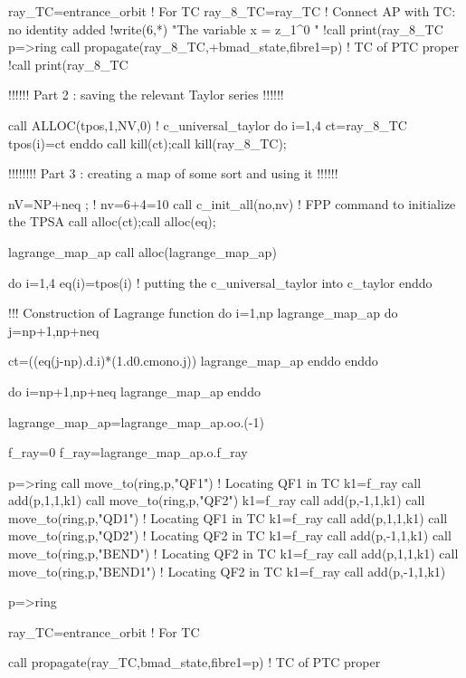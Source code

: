 \documentclass{hitec}     %
\begin{document}
{{\begin{code}
   ray_TC=entrance_orbit   !  For TC
   ray_8_TC=ray_TC  ! Connect AP with TC: no identity added
   !write(6,*) "The variable x = z_1^0 "
   !call print(ray_8_TC%
   p=>ring%
   call propagate(ray_8_TC,+bmad_state,fibre1=p) !  TC of PTC proper
   !call print(ray_8_TC%
   
   !!!!!! Part 2 : saving the relevant Taylor series  !!!!!!

   call ALLOC(tpos,1,NV,0) ! c_universal_taylor
   do i=1,4
    ct=ray_8_TC%
    tpos(i)=ct
   enddo
   call kill(ct);call kill(ray_8_TC);

!!!!!!!! Part 3 : creating a map of some sort and using it !!!!!!


   nV=NP+neq ;  ! nv=6+4=10
   call c_init_all(no,nv)   ! FPP command to initialize the TPSA
   call alloc(ct);call alloc(eq);

   lagrange_map_ap%
   call alloc(lagrange_map_ap)
   
   do i=1,4
    eq(i)=tpos(i)   ! putting the c_universal_taylor into c_taylor
   enddo
   
   !!!  Construction of Lagrange function
   do i=1,np
    lagrange_map_ap%
    do j=np+1,np+neq

     ct=((eq(j-np).d.i)*(1.d0.cmono.j))
     lagrange_map_ap%
    enddo         
   enddo 

   do i=np+1,np+neq
    lagrange_map_ap%
   enddo 
   
   lagrange_map_ap=lagrange_map_ap.oo.(-1)

   f_ray=0
   f_ray=lagrange_map_ap.o.f_ray
   
   p=>ring%
   call move_to(ring,p,"QF1")   !  Locating QF1 in TC
    k1=f_ray%
    call add(p,1,1,k1)
   call move_to(ring,p,"QF2") 
    k1=f_ray%
    call add(p,-1,1,k1)
   call move_to(ring,p,"QD1")   !  Locating QF1 in TC
    k1=f_ray%
    call add(p,1,1,k1)
   call move_to(ring,p,"QD2")   !  Locating QF2 in TC
    k1=f_ray%
    call add(p,-1,1,k1)
   call move_to(ring,p,"BEND")   !  Locating QF2 in TC
    k1=f_ray%
    call add(p,1,1,k1)
   call move_to(ring,p,"BEND1")   !  Locating QF2 in TC
    k1=f_ray%
    call add(p,-1,1,k1)

   p=>ring%

   ray_TC=entrance_orbit   !  For TC
    
   call propagate(ray_TC,bmad_state,fibre1=p) !  TC of PTC proper


\end{code}}}
\end{document}
